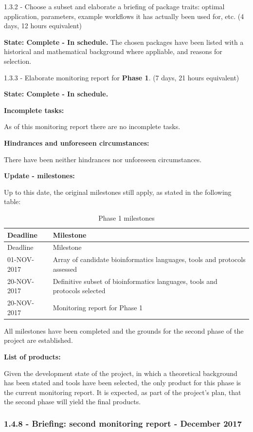 \documentclass[]{article}
\begin{document}
1.3.2 - Choose a subset and elaborate a briefing of package traits:
optimal application, parameters, example workflows it has actually been
used for, etc. (4 days, 12 hours equivalent)

\textbf{State: Complete - In schedule.} The chosen packages have been
listed with a historical and mathematical background where appliable,
and reasons for selection.

1.3.3 - Elaborate monitoring report for \textbf{Phase 1}. (7 days, 21
hours equivalent)

\textbf{State: Complete - In schedule.}

\textbf{Incomplete tasks:}

As of this monitoring report there are no incomplete tasks.

\textbf{Hindrances and unforeseen circumstances:}

There have been neither hindrances nor unforeseen circumstances.

\textbf{Update - milestones:}

Up to this date, the original milestones still apply, as stated in the
following table:

\begin{longtable}[c]{@{}ll@{}}
\caption{Phase 1 milestones}\tabularnewline
\toprule
Deadline & Milestone\tabularnewline
\midrule
\endfirsthead
\toprule
Deadline & Milestone\tabularnewline
\midrule
\endhead
01-NOV-2017 & Array of candidate bioinformatics languages, tools and
protocols assessed\tabularnewline
20-NOV-2017 & Definitive subset of bioinformatics languages, tools and
protocols selected\tabularnewline
20-NOV-2017 & Monitoring report for Phase 1\tabularnewline
\bottomrule
\end{longtable}

All milestones have been completed and the grounds for the second phase
of the project are established.

\textbf{List of products:}

Given the development state of the project, in which a theoretical
background has been stated and tools have been selected, the only
product for this phase is the current monitoring report. It is expected,
as part of the project's plan, that the second phase will yield the
final products.

\subsubsection{1.4.8 - Briefing: second monitoring report - December
2017}\label{briefing-second-monitoring-report---december-2017}
\end{document}
